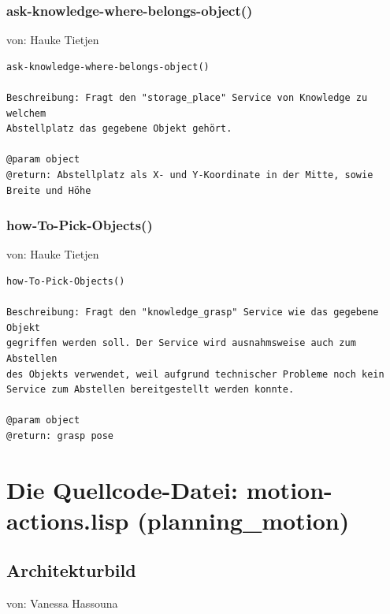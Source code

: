 \documentclass{suturo}
\makeatletter
\newcommand{\chapterauthor}[1]{%
  {\parindent0pt\vspace*{-27pt}%
  \linespread{0}\small\begin{flushright}von: #1\end{flushright}%
  \par\nobreak\vspace*{0pt}}
  \@afterheading%
}
\makeatother
\begin{document}
\subsubsection{ask-knowledge-where-belongs-object()}
\chapterauthor{Hauke Tietjen}
\begin{verbatim}
ask-knowledge-where-belongs-object()

Beschreibung: Fragt den "storage_place" Service von Knowledge zu welchem
Abstellplatz das gegebene Objekt gehört.

@param object
@return: Abstellplatz als X- und Y-Koordinate in der Mitte, sowie
Breite und Höhe
\end{verbatim}


\subsubsection{how-To-Pick-Objects()}
\chapterauthor{Hauke Tietjen}
\begin{verbatim}
how-To-Pick-Objects()

Beschreibung: Fragt den "knowledge_grasp" Service wie das gegebene Objekt 
gegriffen werden soll. Der Service wird ausnahmsweise auch zum Abstellen 
des Objekts verwendet, weil aufgrund technischer Probleme noch kein
Service zum Abstellen bereitgestellt werden konnte.

@param object
@return: grasp pose
\end{verbatim}


\section{Die Quellcode-Datei: motion-actions.lisp (planning\_motion)}
\subsection{Architekturbild}
\chapterauthor{Vanessa Hassouna}


\begin{figure}[!htb]
\end{figure}
\end{document}
